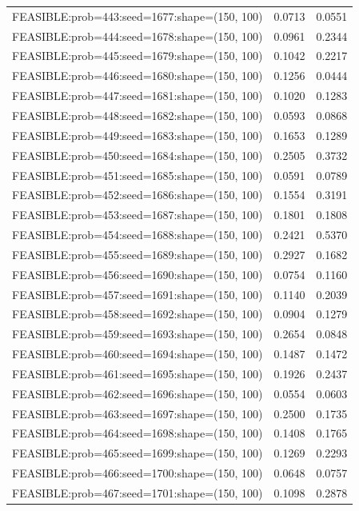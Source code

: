 \begin{longtable}{lcc}
FEASIBLE:prob=443:seed=1677:shape=(150, 100) &   0.0713 & 0.0551 \\
FEASIBLE:prob=444:seed=1678:shape=(150, 100) &   0.0961 & 0.2344 \\
FEASIBLE:prob=445:seed=1679:shape=(150, 100) &   0.1042 & 0.2217 \\
FEASIBLE:prob=446:seed=1680:shape=(150, 100) &   0.1256 & 0.0444 \\
FEASIBLE:prob=447:seed=1681:shape=(150, 100) &   0.1020 & 0.1283 \\
FEASIBLE:prob=448:seed=1682:shape=(150, 100) &   0.0593 & 0.0868 \\
FEASIBLE:prob=449:seed=1683:shape=(150, 100) &   0.1653 & 0.1289 \\
FEASIBLE:prob=450:seed=1684:shape=(150, 100) &   0.2505 & 0.3732 \\
FEASIBLE:prob=451:seed=1685:shape=(150, 100) &   0.0591 & 0.0789 \\
FEASIBLE:prob=452:seed=1686:shape=(150, 100) &   0.1554 & 0.3191 \\
FEASIBLE:prob=453:seed=1687:shape=(150, 100) &   0.1801 & 0.1808 \\
FEASIBLE:prob=454:seed=1688:shape=(150, 100) &   0.2421 & 0.5370 \\
FEASIBLE:prob=455:seed=1689:shape=(150, 100) &   0.2927 & 0.1682 \\
FEASIBLE:prob=456:seed=1690:shape=(150, 100) &   0.0754 & 0.1160 \\
FEASIBLE:prob=457:seed=1691:shape=(150, 100) &   0.1140 & 0.2039 \\
FEASIBLE:prob=458:seed=1692:shape=(150, 100) &   0.0904 & 0.1279 \\
FEASIBLE:prob=459:seed=1693:shape=(150, 100) &   0.2654 & 0.0848 \\
FEASIBLE:prob=460:seed=1694:shape=(150, 100) &   0.1487 & 0.1472 \\
FEASIBLE:prob=461:seed=1695:shape=(150, 100) &   0.1926 & 0.2437 \\
FEASIBLE:prob=462:seed=1696:shape=(150, 100) &   0.0554 & 0.0603 \\
FEASIBLE:prob=463:seed=1697:shape=(150, 100) &   0.2500 & 0.1735 \\
FEASIBLE:prob=464:seed=1698:shape=(150, 100) &   0.1408 & 0.1765 \\
FEASIBLE:prob=465:seed=1699:shape=(150, 100) &   0.1269 & 0.2293 \\
FEASIBLE:prob=466:seed=1700:shape=(150, 100) &   0.0648 & 0.0757 \\
FEASIBLE:prob=467:seed=1701:shape=(150, 100) &   0.1098 & 0.2878 \\

\end{longtable}

